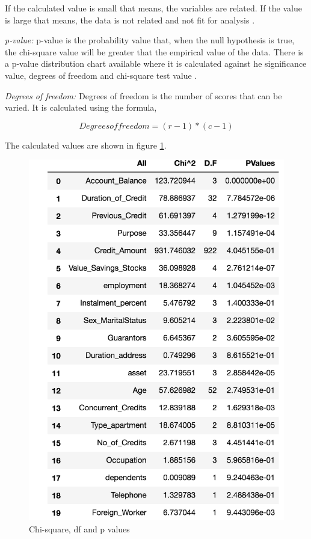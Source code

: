 \documentclass[sigconf]{acmart}
\begin{document}
If the calculated value is small that means, the variables are related. If the value is large that means, the data is not related and not fit for analysis \cite{chi-square}.

\textit{p-value:} p-value is the probability value that, when the null hypothesis is true, the chi-square value will be greater that the empirical value of the data. There is a p-value distribution chart available where it is calculated against he significance value, degrees of freedom and chi-square test value \cite{p-value}.

\textit{Degrees of freedom:} Degrees of freedom is the number of scores that can be varied. It is calculated using the formula,

\begin{equation}
Degrees of freedom=(r-1)*(c-1)
\end{equation}

The calculated values are shown in figure \ref{fig:Figure21}.

\begin{figure}[htb]
  \centering
  \includegraphics[width=1.0\columnwidth]{images/Figure21.png}
  \caption{Chi-square, df and p values}
  \label{fig:Figure21} 
\end{figure}
\end{document}
